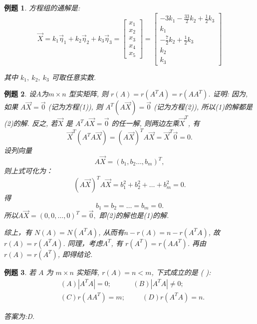 \documentclass[a4paper]{book}
\newtheorem{eg}{例题}[chapter]
\begin{document}
\begin{eg}
方程组的通解是:
\begin{displaymath}
\vec{X}=k_1 \vec{\eta}_1+k_2\vec{\eta}_2+k_3\vec{\eta}_3=\begin{bmatrix}
x_1\\x_2\\x_3\\x_4\\x_5\end{bmatrix}=\begin{bmatrix}-3k_1-\frac{33}{2}k_2+\frac{1}{2}
k_3\\k_1\\-\frac{7}{2}k_2+\frac{1}{2}k_3\\k_2\\k_3\end{bmatrix}\end{displaymath}

其中 $k_1,\ k_2,\ k_3$ 可取任意实数.
\end{eg}

\begin{eg}
设$A$为$m \times n$ 型实矩阵,  则 $r(A) = r(A^TA) = r(AA^T)$.
证明: 因为, 如果 $A\vec{X}=\vec{0}$ (记为方程(1)), 则 $A^T(A\vec{X})=\vec{0}$ (记为方程(2)), 所以(1)的解都是(2)的解. 反之, 若$\vec{X}$ 是 $A^TA\vec{X}=\vec{0}$ 的任一解,  则两边左乘$\vec{X}^T$, 有
\begin{displaymath}
\vec{X}^T(A^TA\vec{X})=(A\vec{X})^TA\vec{X}=\vec{X}^T\vec{0}=0.
\end{displaymath}
设列向量 $$A\vec{X}=(b_1,b_2\dots,b_m)^T,$$
则上式可化为：
$$(A\vec{X})^TA\vec{X}=b_1^2+b_2^2+\dots+b_m^2=0.$$
得$$b_1=b_2=\dots=b_m=0.$$
所以$A\vec{X}=(0,0,\dots,0)^T=\vec{0},$ 即(2)的解也是(1)的解.

综上，有 $N(A)=N(A^TA)$, 从而有$n-r(A) = n-r(A^TA)$, 故$r(A) = r(A^TA)$.
同理，考虑$A^T$, 有 $r(A^T) = r(AA^T)$. 再由$r(A)=r(A^T)$, 即得结论.
\end{eg}

\begin{eg}
若 $A$ 为 $m\times n$ 实矩阵, $r(A) = n < m$, 下式成立的是 (     ):
\begin{displaymath}
\begin{aligned}
&(A) |A^TA|=0; \ \ \ \ \ \ \ \ \ \ \ \ \ \ (B)|A^TA|\not=0;  \\
&(C) r(AA^T)=m;\ \ \ \ \ \ \ \ \ \ \ (D)r(A^TA)=n.
\end{aligned}
\end{displaymath}

答案为:D.
\end{eg}
\end{document}
